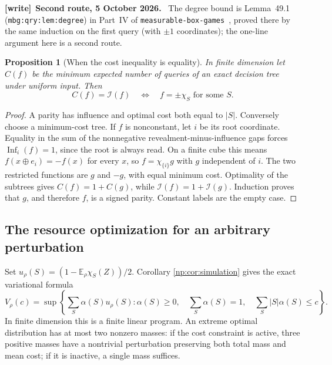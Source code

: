 \documentclass[11pt,a4paper]{article}
\newtheorem{proposition}[theorem]{Proposition}
\theoremstyle{definition}
\theoremstyle{remark}
\newcommand{\E}{\mathbb E}
\newcommand{\Inf}{\operatorname{Inf}}
\newcommand{\file}[1]{\nolinkurl{#1}}
\newenvironment{writenote}[1][]{\par\smallskip\begingroup\small
 \noindent\textbf{[write]}\if\relax\detokenize{#1}\relax\else~\textbf{#1.}\fi\ }%
 {\par\endgroup\smallskip}
\begin{document}
\begin{writenote}[Second route, 5 October 2026]
The degree bound is Lemma~49.1 (\file{mbg:qry:lem:degree}) in Part~IV of
\file{measurable-box-games}~\cite{repoboxart}, proved there by the same
induction on the first query (with \(\pm1\) coordinates); the one-line
argument here is a second route.
\end{writenote}

\begin{proposition}[When the cost inequality is equality]
\label{np:prop:equality}
In finite dimension let \(C(f)\) be the minimum expected number of queries
of an exact decision tree under uniform input. Then
\[
 C(f)=\mathcal I(f)
 \quad\Longleftrightarrow\quad
 f=\pm\chi_S\text{ for some }S.
\]
\end{proposition}
\begin{proof}
A parity has influence and optimal cost both equal to \(|S|\).
Conversely choose a minimum-cost tree. If \(f\) is nonconstant, let \(i\)
be its root coordinate. Equality in the sum of the nonnegative
revealment-minus-influence gaps forces \(\Inf_i(f)=1\), since the root
is always read. On a finite cube this means \(f(x\oplus e_i)=-f(x)\)
for every \(x\), so \(f=\chi_{\{i\}}g\) with \(g\) independent of \(i\).
The two restricted functions are \(g\) and \(-g\), with equal minimum
cost. Optimality of the subtrees gives \(C(f)=1+C(g)\), while
\(\mathcal I(f)=1+\mathcal I(g)\). Induction proves that \(g\), and
therefore \(f\), is a signed parity. Constant labels are the empty case.
\end{proof}

\subsection{The resource optimization for an arbitrary perturbation}

Set \(u_\rho(S)=(1-\E_\rho\chi_S(Z))/2\). Corollary
\ref{np:cor:simulation} gives the exact variational formula
\begin{equation}\label{np:eq:generalbudget}
 V_\rho(c)=\sup\left\{
 \sum_S\alpha(S)u_\rho(S):
 \alpha(S)\ge0,\quad\sum_S\alpha(S)=1,\quad
 \sum_S|S|\alpha(S)\le c\right\}.
\end{equation}
In finite dimension this is a finite linear program. An extreme optimal
distribution has at most two nonzero masses: if the cost constraint is
active, three positive masses have a nontrivial perturbation preserving
both total mass and mean cost; if it is inactive, a single mass suffices.
\end{document}
